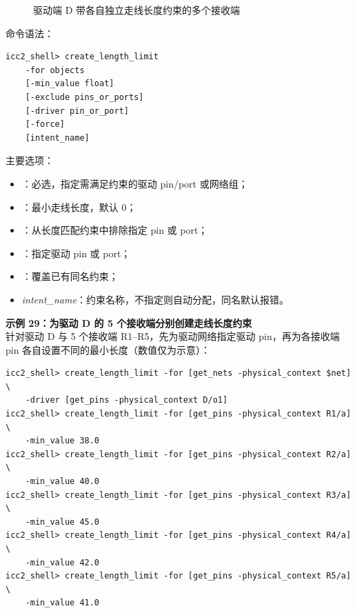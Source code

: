 \begin{figure}[htbp]
\centering
{}
\caption{驱动端 D 带各自独立走线长度约束的多个接收端}
\label{fig:receivers-individual-length}
\end{figure}

命令语法：
\begin{lstlisting}
icc2_shell> create_length_limit
    -for objects
    [-min_value float]
    [-exclude pins_or_ports]
    [-driver pin_or_port]
    [-force]
    [intent_name]
\end{lstlisting}

主要选项：
\begin{itemize}
  \item {}：必选，指定需满足约束的驱动 pin/port 或网络组；
  \item {}：最小走线长度，默认 0；
  \item {}：从长度匹配约束中排除指定 pin 或 port；
  \item {}：指定驱动 pin 或 port；
  \item {}：覆盖已有同名约束；
  \item \textit{intent\_name}：约束名称，不指定则自动分配，同名默认报错。
\end{itemize}

\textbf{示例 29：为驱动 D 的 5 个接收端分别创建走线长度约束}\\
针对驱动 D 与 5 个接收端 R1--R5，先为驱动网络指定驱动 pin，再为各接收端 pin 各自设置不同的最小长度（数值仅为示意）：

\begin{lstlisting}
icc2_shell> create_length_limit -for [get_nets -physical_context $net] \
    -driver [get_pins -physical_context D/o1]
icc2_shell> create_length_limit -for [get_pins -physical_context R1/a] \
    -min_value 38.0
icc2_shell> create_length_limit -for [get_pins -physical_context R2/a] \
    -min_value 40.0
icc2_shell> create_length_limit -for [get_pins -physical_context R3/a] \
    -min_value 45.0
icc2_shell> create_length_limit -for [get_pins -physical_context R4/a] \
    -min_value 42.0
icc2_shell> create_length_limit -for [get_pins -physical_context R5/a] \
    -min_value 41.0
\end{lstlisting}

